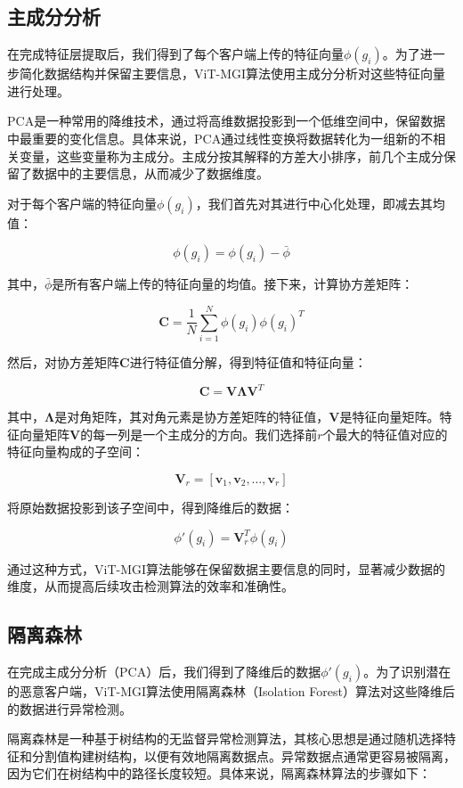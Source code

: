 \documentclass[conference]{IEEEtran}
\begin{document}
\subsection{主成分分析}
\label{sec:method_PCA}

在完成特征层提取后，我们得到了每个客户端上传的特征向量$\phi(g_i)$。为了进一步简化数据结构并保留主要信息，ViT-MGI算法使用主成分分析对这些特征向量进行处理。

PCA是一种常用的降维技术，通过将高维数据投影到一个低维空间中，保留数据中最重要的变化信息。具体来说，PCA通过线性变换将数据转化为一组新的不相关变量，这些变量称为主成分。主成分按其解释的方差大小排序，前几个主成分保留了数据中的主要信息，从而减少了数据维度。

对于每个客户端的特征向量$\phi(g_i)$，我们首先对其进行中心化处理，即减去其均值：

\[
\phi(g_i) = \phi(g_i) - \bar{\phi}
\]

其中，$\bar{\phi}$是所有客户端上传的特征向量的均值。接下来，计算协方差矩阵：

\[
\mathbf{C} = \frac{1}{N} \sum_{i=1}^N \phi(g_i) \phi(g_i)^T
\]

然后，对协方差矩阵$\mathbf{C}$进行特征值分解，得到特征值和特征向量：

\[
\mathbf{C} = \mathbf{V} \mathbf{\Lambda} \mathbf{V}^T
\]

其中，$\mathbf{\Lambda}$是对角矩阵，其对角元素是协方差矩阵的特征值，$\mathbf{V}$是特征向量矩阵。特征向量矩阵$\mathbf{V}$的每一列是一个主成分的方向。我们选择前$r$个最大的特征值对应的特征向量构成的子空间：

\[
\mathbf{V}_r = [\mathbf{v}_1, \mathbf{v}_2, \ldots, \mathbf{v}_r]
\]

将原始数据投影到该子空间中，得到降维后的数据：

\[
\phi'(g_i) = \mathbf{V}_r^T \phi(g_i)
\]

通过这种方式，ViT-MGI算法能够在保留数据主要信息的同时，显著减少数据的维度，从而提高后续攻击检测算法的效率和准确性。

\subsection{隔离森林}
\label{sec:method_forest}

在完成主成分分析（PCA）后，我们得到了降维后的数据$\phi'(g_i)$。为了识别潜在的恶意客户端，ViT-MGI算法使用隔离森林（Isolation Forest）算法对这些降维后的数据进行异常检测。

隔离森林是一种基于树结构的无监督异常检测算法，其核心思想是通过随机选择特征和分割值构建树结构，以便有效地隔离数据点。异常数据点通常更容易被隔离，因为它们在树结构中的路径长度较短。具体来说，隔离森林算法的步骤如下：
\end{document}
